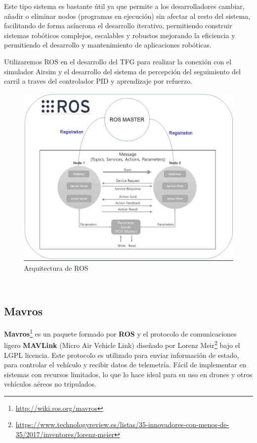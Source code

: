 Este tipo sistema es bastante útil ya que permite a los desarrolladores cambiar, añadir o eliminar nodos (programas en ejecución) sin afectar al resto del sistema, facilitando de forma asíncrona
el desarrollo iterativo, permitiendo construir sistemas robóticos complejos, escalables y robustos mejorando la eficiencia y permitiendo el desarrollo y mantenimiento de aplicaciones
robóticas. \newline

Utilizaremos ROS en el desarrollo del TFG para realizar la conexión con el simulador Airsim y el desarrollo del sistema de percepción del seguimiento del carril a traves del controlador PID y 
aprendizaje por refuerzo. \newline


\begin{figure} [H]
    \begin{center}
      \includegraphics[scale=0.4]{figs/Plataformas_Desarollo/arq_ros.png}
    \end{center}
    \caption{Arquitectura de ROS}
    \label{fig:ArqROS}
  \end{figure}\
\newpage
\subsection{Mavros}
\label{sec:mavros}

\textbf{Mavros}\footnote{\url{http://wiki.ros.org/mavros}} es un paquete formado por \textbf{ROS} y el protocolo de comunicaciones ligero \textbf{MAVLink} (Micro Air Vehicle Link) diseñado por Lorenz Meir\footnote{\url{https://www.technologyreview.es/listas/35-innovadores-con-menos-de-35/2017/inventores/lorenz-meier}} bajo el LGPL licencia. Este protocolo es utilizado para enviar información de estado,
para controlar el vehículo y recibir datos de telemetría. Fácil de implementar en sistemas con recursos limitados, 
lo que lo hace ideal para su uso en drones y otros vehículos aéreos no tripulados. \newline


